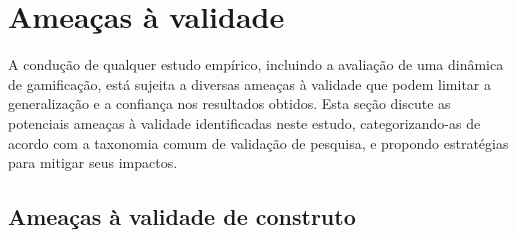 \documentclass[
	12pt,
	openright,
	twoside,
	a4paper,
	english,
	brazil
	]{abntex2}
\begin{document}
\section{Ameaças à validade}

A condução de qualquer estudo empírico, incluindo a avaliação de uma dinâmica de gamificação, está sujeita a diversas ameaças à validade que podem limitar a generalização e a confiança nos resultados obtidos. Esta seção discute as potenciais ameaças à validade identificadas neste estudo, categorizando-as de acordo com a taxonomia comum de validação de pesquisa, e propondo estratégias para mitigar seus impactos.

\subsection{Ameaças à validade de construto}
\label{sec:ameacas-construto}
\end{document}
